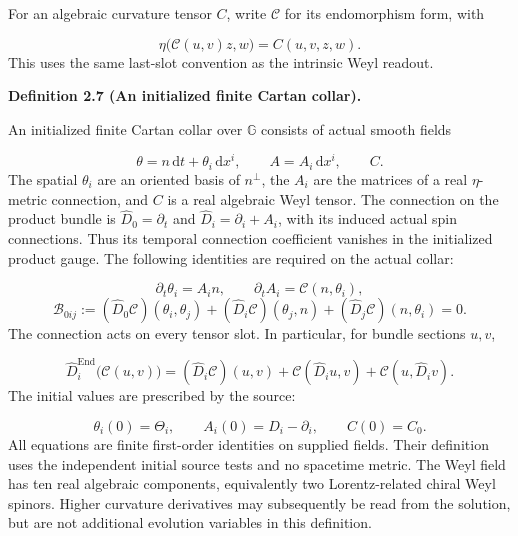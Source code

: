 \documentclass[
  english,
  11pt,
  reqno]{amsart}
\makeatletter
\newcommand{\pandocstatementheading}[1]{%
  \par\addpenalty{\@beginparpenalty}%
  \addvspace{.5\baselineskip plus .2\baselineskip minus .2\baselineskip}%
  {\normalfont\bfseries #1\par}%
  \nobreak\@afterindenttrue\@afterheading
}
\makeatother
\begin{document}
For an algebraic curvature tensor \(C\), write \(\mathcal C\) for its
endomorphism form, with

\label{eq:online-cartan-curvature-endomorphism} \[
\eta\bigl(\mathcal C(u,v)z,w\bigr)=C(u,v,z,w).
\] This uses the same last-slot convention as the intrinsic Weyl
readout.

\pandocstatementheading{\leavevmode{}\label{def:online-finite-cartan-collar}Definition 2.7 (An initialized finite Cartan collar).}

An initialized finite Cartan collar over \(\mathbb G\) consists of
actual smooth fields

\label{eq:online-cartan-temporal-fields} \[
\theta=n\,\mathrm dt+\theta_i\,\mathrm dx^i,
\qquad
A=A_i\,\mathrm dx^i,
\qquad C.
\] The spatial \(\theta_i\) are an oriented basis of \(n^\perp\), the
\(A_i\) are the matrices of a real \(\eta\)-metric connection, and \(C\)
is a real algebraic Weyl tensor. The connection on the product bundle is
\(\widehat D_0=\partial_t\) and \(\widehat D_i=\partial_i+A_i\), with
its induced actual spin connections. Thus its temporal connection
coefficient vanishes in the initialized product gauge. The following
identities are required on the actual collar:

\label{eq:online-cartan-temporal-equations} \[
\partial_t\theta_i=A_i n,
\qquad
\partial_t A_i=\mathcal C(n,\theta_i),
\] \label{eq:online-cartan-mixed-bianchi} \[
\mathcal B_{0ij}
:=
(\widehat D_0\mathcal C)(\theta_i,\theta_j)
+(\widehat D_i\mathcal C)(\theta_j,n)
+(\widehat D_j\mathcal C)(n,\theta_i)
=0.
\] The connection acts on every tensor slot. In particular, for bundle
sections \(u,v\),

\label{eq:online-cartan-evaluated-tensor-derivative} \[
\widehat D_i^{\operatorname{End}}\bigl(\mathcal C(u,v)\bigr)
=(\widehat D_i\mathcal C)(u,v)
+\mathcal C(\widehat D_i u,v)
+\mathcal C(u,\widehat D_i v).
\] The initial values are prescribed by the source:

\label{eq:online-cartan-exact-initial-values} \[
\theta_i(0)=\Theta_i,
\qquad
A_i(0)=D_i-\partial_i,
\qquad
C(0)=C_0.
\] All equations are finite first-order identities on supplied fields.
Their definition uses the independent initial source tests and no
spacetime metric. The Weyl field has ten real algebraic components,
equivalently two Lorentz-related chiral Weyl spinors. Higher curvature
derivatives may subsequently be read from the solution, but are not
additional evolution variables in this definition.
\end{document}
